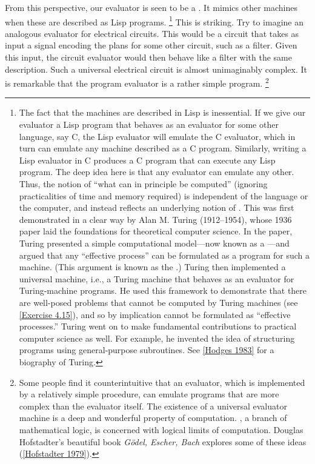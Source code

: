 From this perspective, our evaluator is seen to be a .
It mimics other machines when these are described as Lisp programs.%
\footnote{
	The fact that the machines are described in Lisp is inessential.
	If we give our evaluator a Lisp program that behaves as an evaluator for some other language, say C, the Lisp evaluator will emulate the C evaluator, which in turn can emulate any machine described as a C program.
	Similarly, writing a Lisp evaluator in C produces a C program that can execute any Lisp program.
	The deep idea here is that any evaluator can emulate any other.
	Thus, the notion of “what can in principle be computed” (ignoring practicalities of time and memory required) is independent of the language or the computer, and instead reflects an underlying notion of .
	This was first demonstrated in a clear way by Alan M.
	Turing (1912--1954), whose 1936 paper laid the foundations for theoretical computer science.
	In the paper, Turing presented a simple computational model---now known as a ---and argued that any “effective process” can be formulated as a program for such a machine.
	(This argument is known as the .)
	Turing then implemented a universal machine, i.e., a Turing machine that behaves as an evaluator for Turing-machine programs.
	He used this framework to demonstrate that there are well-posed problems that cannot be computed by Turing machines (see \cref{Exercise 4.15}), and so by implication cannot be formulated as “effective processes.”
	Turing went on to make fundamental contributions to practical computer science as well.
	For example, he invented the idea of structuring programs using general-purpose subroutines.
	See \cref{Hodges 1983} for a biography of Turing.
}
This is striking.
Try to imagine an analogous evaluator for electrical circuits.
This would be a circuit that takes as input a signal encoding the plans for some other circuit, such as a filter.
Given this input, the circuit evaluator would then behave like a filter with the same description.
Such a universal electrical circuit is almost unimaginably complex.
It is remarkable that the program evaluator is a rather simple program.%
\footnote{
	Some people find it counterintuitive that an evaluator, which is implemented by a relatively simple procedure, can emulate programs that are more complex than the evaluator itself.
	The existence of a universal evaluator machine is a deep and wonderful property of computation.
	, a branch of mathematical logic, is concerned with logical limits of computation.
	Douglas Hofstadter’s beautiful book \textit{Gödel, Escher, Bach} explores some of these ideas (\cref{Hofstadter 1979}).
}

